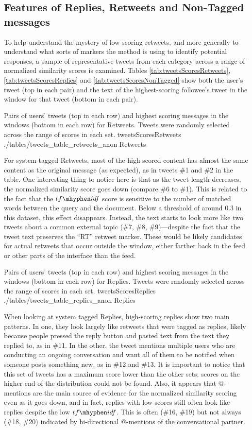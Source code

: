 \subsection{Features of Replies, Retweets and Non-Tagged messages}

To help understand the mystery of low-scoring retweets, and more generally to understand what sorts of markers the method is using to identify potential responses, a sample of representative tweets from each category across a range of normalized similarity scores is examined.  
Tables \ref{tab:tweetsScoresRetweets}, \ref{tab:tweetsScoresReplies} and \ref{tab:tweetsScoresNonTagged} show both the user's tweet (top in each pair) and the text of the highest-scoring followee's tweet in the window for that tweet (bottom in each pair).

\tweetTableFull
{Pairs of users' tweets (top in each row) and highest scoring messages in the windows (bottom in each row) for Retweets.  Tweets were randomly selected across the range of scores in each set.}
{tweetsScoresRetweets}
{./tables/tweets_table_retweets_anon}
{Retweets}

For system tagged Retweets, most of the high scored content has almost the same content as the original message (as expected), as in tweets \#1 and \#2 in the table.  One interesting thing to notice here is that as the tweet length decreases, the normalized similarity score goes down (compare \#6 to \#1). This is related to the fact that the $tf\mhyphen idf$ score is sensitive to the number of matched words between the query and the document.  
Below a threshold of around $0.3$ in this dataset, this effect disappears.  Instead, the text starts to look more like 
two tweets about a common external topic (\#7, \#8, \#9)---despite the fact that the tweet text preserves the ``RT'' retweet marker.  These would be likely candidates for actual retweets that occur outside the window, either farther back in the feed or other parts of the interface than the feed.

\tweetTableFull
{Pairs of users' tweets (top in each row) and highest scoring messages in the windows (bottom in each row) for Replies.  Tweets were randomly selected across the range of scores in each set.}
{tweetsScoresReplies}
{./tables/tweets_table_replies_anon}
{Replies}

When looking at system tagged Replies, high-scoring replies show two main patterns.  In one, they look largely like retweets that were tagged as replies, likely because people pressed the reply button and pasted text from the text they replied to, as in \#11.  In the other, the tweet mentions multiple users who are conducting an ongoing conversation and want all of them to be notified when someone posts something new, as in \#12 and \#13.  It is important to notice that this set of tweets has a maximum score lower than the other sets; scores on the higher end of the distribution could not be found. Also, it appears that @-mentions are the main source of evidence for the normalized similarity scoring even as it goes down, and in fact, replies with low scores still often look like replies despite the low $tf\mhyphen idf$.  This is often (\#16, \#19) but not always (\#18, \#20) indicated by bi-directional @-mentions of the conversational partner.

